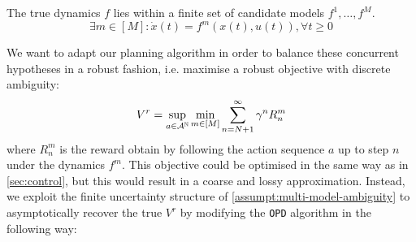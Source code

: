 \begin{assumption}
	\label{assumpt:multi-model-ambiguity}
	\begin{leftbar}[assumptionbar]
	The true dynamics $f$ lies within a finite set of candidate models $f^1, \dots, f^M$.
	\begin{equation*}
	\exists m\in[M]: \dot{x}(t) = f^m(x(t), u(t)), \forall t\geq 0
	\end{equation*}
	\end{leftbar}
\end{assumption}
We want to adapt our planning algorithm in order to balance these concurrent hypotheses in a robust fashion, i.e. maximise a robust objective with discrete ambiguity:
\begin{equation}
\label{eq:robust-objective-discrete}
V^r = \sup_{a\in\mathcal{A}^{\mathbb{N}}}\min_{m\in[M]} \sum_{n=N+1}^\infty \gamma^n R_n^m
\end{equation}
where $R_n^m$ is the reward obtain by following the action sequence $a$ up to step $n$ under the dynamics $f^m$.
This objective could be optimised in the same way as in \autoref{sec:control}, but this would result in a coarse and lossy approximation. Instead, we exploit the finite uncertainty structure of \autoref{assumpt:multi-model-ambiguity} to asymptotically recover the true $V^r$ by modifying the \texttt{OPD} algorithm in the following way:

